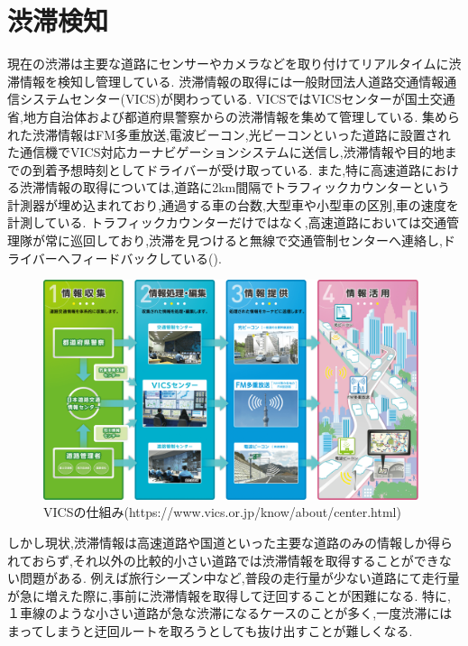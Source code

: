 \section{渋滞検知}
現在の渋滞は主要な道路にセンサーやカメラなどを取り付けてリアルタイムに渋滞情報を検知し管理している.
渋滞情報の取得には一般財団法人道路交通情報通信システムセンター(VICS)\cite{vics}が関わっている.
VICSではVICSセンターが国土交通省,地方自治体および都道府県警察からの渋滞情報を集めて管理している.
集められた渋滞情報はFM多重放送,電波ビーコン,光ビーコンといった道路に設置された通信機でVICS対応カーナビゲーションシステムに送信し,渋滞情報や目的地までの到着予想時刻としてドライバーが受け取っている.
また,特に高速道路における渋滞情報の取得については,道路に2km間隔でトラフィックカウンターという計測器が埋め込まれており,通過する車の台数,大型車や小型車の区別,車の速度を計測している.
トラフィックカウンターだけではなく,高速道路においては交通管理隊が常に巡回しており,渋滞を見つけると無線で交通管制センターへ連絡し,ドライバーへフィードバックしている().

\begin{figure}[htbp]
  \begin{center}
   \includegraphics[width=11cm]{figs/vics.png}
  \end{center}
  \caption{VICSの仕組み(https://www.vics.or.jp/know/about/center.html)}
  \label{fig:vics_system}
\end{figure}

しかし現状,渋滞情報は高速道路や国道といった主要な道路のみの情報しか得られておらず,それ以外の比較的小さい道路では渋滞情報を取得することができない問題がある.
例えば旅行シーズン中など,普段の走行量が少ない道路にて走行量が急に増えた際に,事前に渋滞情報を取得して迂回することが困難になる.
特に,１車線のような小さい道路が急な渋滞になるケースのことが多く,一度渋滞にはまってしまうと迂回ルートを取ろうとしても抜け出すことが難しくなる.

